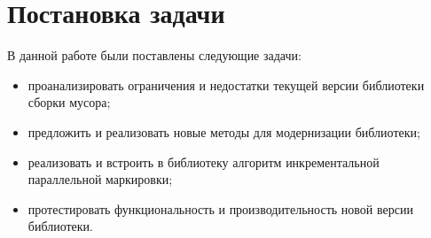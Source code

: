 \section*{Постановка задачи}

В данной работе были поставлены следующие задачи:

\begin{itemize}
\item проанализировать ограничения и недостатки текущей версии библиотеки сборки мусора;
\item предложить и реализовать новые методы для модернизации библиотеки;
\item реализовать и встроить в библиотеку алгоритм инкрементальной параллельной маркировки; 
\item протестировать функциональность и производительность новой версии библиотеки.
\end{itemize}